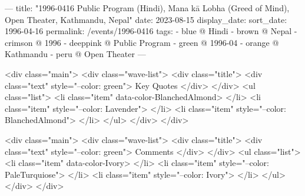 ---
title: "1996-0416 Public Program (Hindi), Mana kā Lobha (Greed of Mind), Open Theater, Kathmandu, Nepal"
date: 2023-08-15
display_date: 
sort_date: 1996-04-16
permalink: /events/1996-0416
tags:
  - blue @ Hindi
  - brown @ Nepal
  - crimson @ 1996
  - deeppink @ Public Program
  - green @ 1996-04
  - orange @ Kathmandu
  - peru @ Open Theater
---

<div class="main">
  <div class="wave-list">
    <div class="title">
      <div class="text" style="--color: green">
        Key Quotes
      </div>
    </div>
    <ul class="list">
        <li class="item" data-color-BlanchedAlmond>
        </li>
        <li class="item" style="--color: Lavender">
        </li>
        <li class="item" style="--color: BlanchedAlmond">
        </li>
      </ul>
  </div>
</div>

<div class="main">
  <div class="wave-list">
    <div class="title">
      <div class="text" style="--color: green">
        Comments
      </div>
    </div>
    <ul class="list">
        <li class="item" data-color-Ivory>
        </li>
        <li class="item" style="--color: PaleTurquiose">
        </li>
        <li class="item" style="--color: Ivory">
        </li>
      </ul>
  </div>
</div>